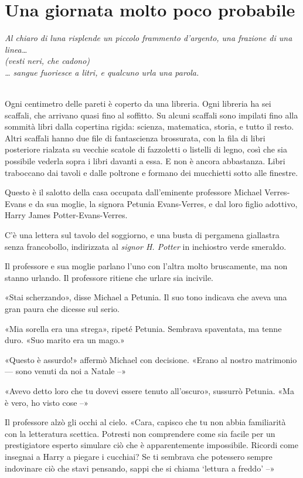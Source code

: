 
\chapter{Una giornata molto poco probabile}
\label{capitolo:1}

\emph {Al chiaro di luna risplende un piccolo frammento d’argento, una frazione di una linea…\\
(vesti neri, che cadono)\\
… sangue fuoriesce a litri, e qualcuno urla una parola.}

~\\


Ogni centimetro delle pareti è coperto da una libreria. Ogni libreria ha sei scaffali, che arrivano quasi fino al soffitto. Su alcuni scaffali sono impilati fino alla sommità libri dalla copertina rigida: scienza, matematica, storia, e tutto il resto. Altri scaffali hanno due file di fantascienza brossurata, con la fila di libri posteriore rialzata su vecchie scatole di fazzoletti o listelli di legno, così che sia possibile vederla sopra i libri davanti a essa. E non è ancora abbastanza. Libri traboccano dai tavoli e dalle poltrone e formano dei mucchietti sotto alle finestre.

Questo è il salotto della casa occupata dall’eminente professore Michael Verres-Evans e da sua moglie, la signora Petunia Evans-Verres, e dal loro figlio adottivo, Harry James Potter-Evans-Verres.

C’è una lettera sul tavolo del soggiorno, e una busta di pergamena giallastra senza francobollo, indirizzata al \emph{signor H. Potter} in inchiostro verde smeraldo.

Il professore e sua moglie parlano l’uno con l’altra molto bruscamente, ma non stanno urlando. Il professore ritiene che urlare sia incivile.

«Stai scherzando», disse Michael a Petunia. Il suo tono indicava che aveva una gran paura che dicesse sul serio.

«Mia sorella era una strega», ripeté Petunia. Sembrava spaventata, ma tenne duro. «Suo marito era un mago.»

«Questo è assurdo!» affermò Michael con decisione. «Erano al nostro matrimonio — sono venuti da noi a Natale –»

«Avevo detto loro che tu dovevi essere tenuto all’oscuro», sussurrò Petunia. «Ma è vero, ho visto cose –»

Il professore alzò gli occhi al cielo. «Cara, capisco che tu non abbia familiarità con la letteratura scettica. Potresti non comprendere come sia facile per un prestigiatore esperto simulare ciò che è apparentemente impossibile. Ricordi come insegnai a Harry a piegare i cucchiai? Se ti sembrava che potessero sempre indovinare ciò che stavi pensando, sappi che si chiama ‘lettura a freddo’ –»


